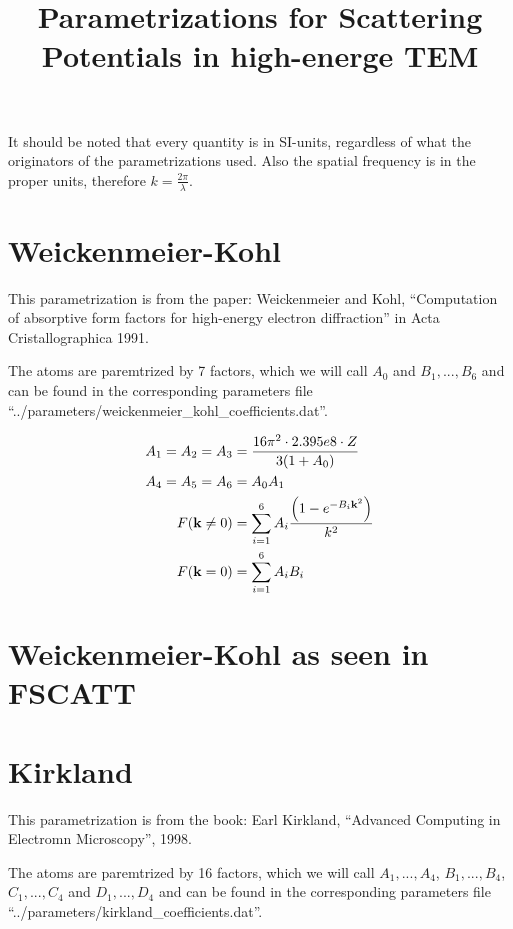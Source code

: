 \documentclass{scrartcl}
\title{Parametrizations for Scattering Potentials in high-energe TEM}
\date{}
\begin{document}
\maketitle

\def\vk{{\bf k}}
\def\vr{{\bf r}}

It should be noted that every quantity is in SI-units, regardless of what the originators of the parametrizations used. Also the spatial frequency is in the proper units, therefore \(k = \frac{2 \pi}{\lambda}\).

\section{Weickenmeier-Kohl}

This parametrization is from the paper: Weickenmeier and Kohl, ``Computation of absorptive form factors for high-energy electron diffraction'' in Acta Cristallographica 1991.

The atoms are paremtrized by 7 factors, which we will call \(A_0\) and \(B_1, ..., B_6\) and can be found in the corresponding parameters file ``../parameters/weickenmeier\_kohl\_coefficients.dat''.

\begin{align}
  A_1 = A_2 = A_3 &= \frac{16 \pi^2 \cdot 2.395e8 \cdot Z}{3(1+A_0)}\\
  A_4 = A_5 = A_6 &= A_0 A_1\\
  F(\vk \neq 0) &= \sum\limits_{i=1}^{6} A_i \frac{\left(1-e^{-B_i \vk^2}\right)}{k^2}\\
  F(\vk = 0) &= \sum\limits_{i=1}^{6} A_i B_i
\end{align}

\section{Weickenmeier-Kohl as seen in FSCATT}

\section{Kirkland}

This parametrization is from the book: Earl Kirkland, ``Advanced Computing in Electromn Microscopy'', 1998.


The atoms are paremtrized by 16 factors, which we will call \(A_1, ..., A_4\), \(B_1, ..., B_4\), \(C_1, ..., C_4\) and \(D_1, ..., D_4\) and can be found in the corresponding parameters file ``../parameters/kirkland\_coefficients.dat''.
\end{document}
